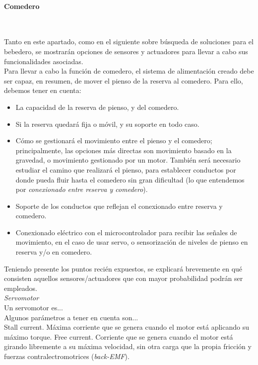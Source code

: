 \documentclass[12pt]{article}
\newcommand{\subsubsubsection}[1]{\paragraph{#1}\mbox{}\\}
\begin{document}
	\pagebreak
	
	\subsubsubsection{Comedero}
	\label{subsubsubsection: comedero busqueda}
	
	\noindent Tanto en este apartado, como en el siguiente sobre búsqueda de soluciones para el bebedero, se mostrarán opciones de sensores y actuadores para llevar a cabo sus funcionalidades asociadas.\\
	
	\noindent Para llevar a cabo la función de comedero, el sistema de alimentación creado debe ser capaz, en resumen, de mover el pienso de la reserva al comedero. Para ello, debemos tener en cuenta: 
	
	\begin{itemize}
		\item La capacidad de la reserva de pienso, y del comedero.
		\item Si la reserva quedará fija o móvil, y su soporte en todo caso.
		\item Cómo se gestionará el movimiento entre el pienso y el comedero; principalmente, las opciones más directas son movimiento basado en la gravedad, o movimiento gestionado por un motor. También será necesario estudiar el camino que realizará el pienso, para establecer conductos por donde pueda fluir hasta el comedero sin gran dificultad (lo que entendemos por \textit{conexionado entre reserva y comedero}).
		\item Soporte de los conductos que reflejan el conexionado entre reserva y comedero.
		\item Conexionado eléctrico con el microcontrolador para recibir las señales de movimiento, en el caso de usar servo, o sensorización de niveles de pienso en reserva y/o en comedero.
	\end{itemize}
	
	\noindent Teniendo presente los puntos recién expuestos, se explicará brevemente en qué consisten aquellos sensores/actuadores que con mayor probabilidad podrán ser empleados. \\
	
	\noindent \textit{Servomotor} \\
	
	\noindent Un servomotor es... \\
	
	\noindent Algunos parámetros a tener en cuenta son... \\
	\noindent Stall current. Máxima corriente que se genera cuando el motor está aplicando su máximo torque. Free current. Corriente que se genera cuando el motor está girando libremente a su máxima velocidad, sin otra carga que la propia fricción y fuerzas contralectromotrices (\textit{back-EMF}). \\
	
\end{document}
